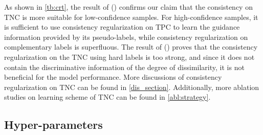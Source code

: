 \documentclass[lettersize,journal]{IEEEtran}
\theoremstyle{plain}
\theoremstyle{definition}
\theoremstyle{remark}
\begin{document}
As shown  in \cref{tb:crt}, the result of () confirms our claim that the consistency on TNC is more suitable for low-confidence samples. For high-confidence samples, it is sufficient to use consistency regularization on TPC to learn the guidance information provided by its pseudo-labels, while consistency regularization on complementary labels is superfluous. The result of ()  proves that the consistency regularization on the TNC using hard labels is too strong, and since it does not contain the discriminative information of the degree of dissimilarity, it is not beneficial for the model performance. 
More discussions of consistency regularization on TNC can be found in \cref{dis_section}. Additionally, more ablation studies on learning scheme of TNC can be found  in \cref{abl:strategy}.
 \begin{table}[t]
\centering
  \footnotesize
    
   \caption{Ablation study on consistency regularization on TNC, which is corresponding to the settings of () and () in \cref{subsec:cr}. Results are reported on CIFAR-10 with 40 labels.} 
   \vskip 0in
   \label{tb:crt}
\vskip 0in
   \end{table}

\subsection{Hyper-parameters}
\label{sec:hp}
\end{document}
